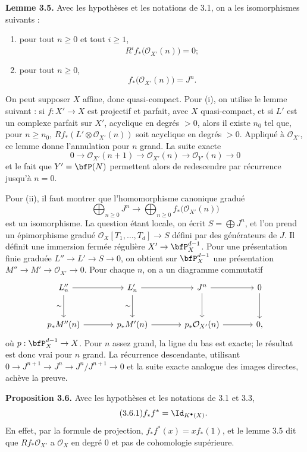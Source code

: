 \documentclass[11pt]{article}
\providecommand{\cO}{\mathcal O}
\begin{document}
\textbf{Lemme 3.5.} Avec les hypothèses et les notations de 3.1, on a les isomorphismes suivants :
\begin{enumerate}[label=\roman*)]
\item pour tout \(n\ge0\) et tout \(i\ge1\),
\[
R^if_*\bigl(\cO_{X'}(n)\bigr)=0;
\]
\item pour tout \(n\ge0\),
\[
f_*\bigl(\cO_{X'}(n)\bigr)=J^n.
\]
\end{enumerate}
On peut supposer \(X\) affine, donc quasi-compact. Pour (i), on utilise le lemme suivant : si \(f:X'\to X\) est projectif et parfait, avec \(X\) quasi-compact, et si \(L'\) est un complexe parfait sur \(X'\), acyclique en degrés \(>0\), alors il existe \(n_0\) tel que, pour \(n\ge n_0\), \(Rf_*(L'\otimes\cO_{X'}(n))\) soit acyclique en degrés \(>0\). Appliqué à \(\cO_{X'}\), ce lemme donne l'annulation pour \(n\) grand. La suite exacte
\[
0\to \cO_{X'}(n+1)\to\cO_{X'}(n)\to\cO_{Y'}(n)\to0
\]
et le fait que \(Y'=\bfP(N)\) permettent alors de redescendre par récurrence jusqu'à \(n=0\).

Pour (ii), il faut montrer que l'homomorphisme canonique gradué
\[
\bigoplus_{n\ge0}J^n\longrightarrow\bigoplus_{n\ge0}f_*\bigl(\cO_{X'}(n)\bigr)
\]
est un isomorphisme. La question étant locale, on écrit \(S=\bigoplus J^n\), et l'on prend un épimorphisme gradué \(\cO_X[T_1,\ldots,T_d]\to S\) défini par des générateurs de \(J\). Il définit une immersion fermée régulière \(X'\to\bfP_X^{d-1}\). Pour une présentation finie graduée \(L''\to L'\to S\to0\), on obtient sur \(\bfP_X^{d-1}\) une présentation \(M''\to M'\to\cO_{X'}\to0\). Pour chaque \(n\), on a un diagramme commutatif
\[
\begin{tikzcd}[column sep=large,row sep=large]
L''_n \arrow[r] \arrow[d,"\sim"'] & L'_n \arrow[r] \arrow[d,"\sim"'] & J^n \arrow[r] \arrow[d] & 0 \arrow[d]\\
p_*M''(n) \arrow[r] & p_*M'(n) \arrow[r] & p_*\cO_{X'}(n) \arrow[r] & 0,
\end{tikzcd}
\]
où \(p:\bfP_X^{d-1}\to X\). Pour \(n\) assez grand, la ligne du bas est exacte; le résultat est donc vrai pour \(n\) grand. La récurrence descendante, utilisant \(0\to J^{n+1}\to J^n\to J^n/J^{n+1}\to0\) et la suite exacte analogue des images directes, achève la preuve.

\textbf{Proposition 3.6.} Avec les hypothèses et les notations de 3.1 et 3.3,
\begin{equation}\tag{3.6.1}
f_*f^*=\Id_{K^\bullet(X)}.
\end{equation}
En effet, par la formule de projection, \(f_*f^*(x)=xf_*(1)\), et le lemme 3.5 dit que \(Rf_*\cO_{X'}\) a \(\cO_X\) en degré \(0\) et pas de cohomologie supérieure.
\end{document}
